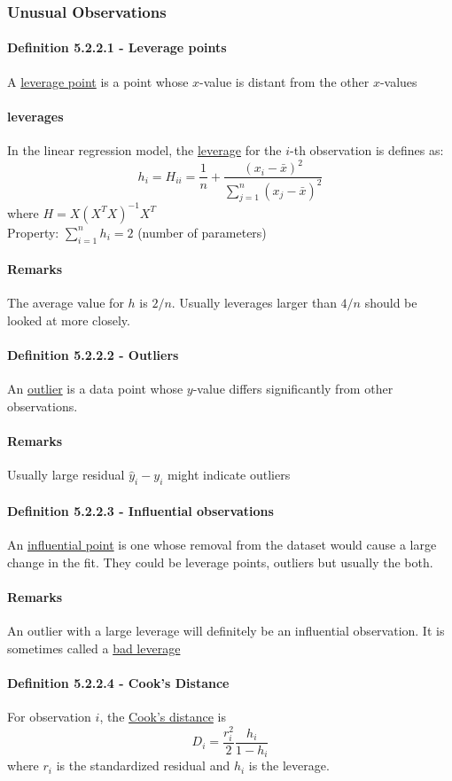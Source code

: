 \documentclass[11pt]{article}
\newcommand{\under}[1]{\underline{#1}}
\begin{document}
\subsubsection{Unusual Observations}
\paragraph{Definition 5.2.2.1 - Leverage points}
A \under{leverage point} is a point whose $x$-value is distant from the other $x$-values
\paragraph{leverages}
In the linear regression model, the \under{leverage} for the $i$-th observation is defines as:
$$h_i = H_{ii} = \frac{1}{n}+\frac{(x_i-\bar{x})^2}{\sum_{j=1}^n(x_j-\bar{x})^2}$$
where $H = X(X^TX)^{-1}X^T$ \\
Property: $\sum_{i=1}^n h_i = 2$ (number of parameters)
\paragraph{Remarks}
The average value for $h$ is $2/n$. Usually leverages larger than $4/n$ should be looked at more closely.
\paragraph{Definition 5.2.2.2 - Outliers}
An \under{outlier} is a data point whose $y$-value differs significantly from other observations.
\paragraph{Remarks}
Usually large residual $\hat{y}_i - y_i$ might indicate outliers
\paragraph{Definition 5.2.2.3 - Influential observations}
An \under{influential point} is one whose removal from the dataset would cause a large change in the fit. They could be leverage points, outliers but usually the both.
\paragraph{Remarks}
An outlier with a large leverage will definitely be an influential observation. It is sometimes called a \under{bad leverage}
\paragraph{Definition 5.2.2.4 - Cook's Distance}
For observation $i$, the \under{Cook's distance} is $$D_i = \frac{r_i^2}{2} \frac{h_i}{1-h_i}$$ where $r_i$ is the standardized residual and $h_i$ is the leverage.
\end{document}
